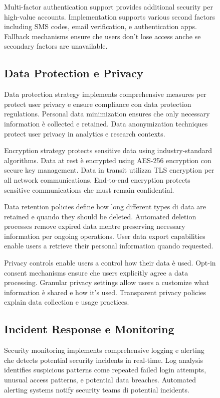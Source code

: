 \documentclass[12pt,a4paper]{article}
\begin{document}
\begin{figure}[H]
Multi-factor authentication support provides additional security per high-value accounts. Implementation supports various second factors including SMS codes, email verification, e authentication apps. Fallback mechanisms ensure che users don't lose access anche se secondary factors are unavailable.

\subsection{Data Protection e Privacy}

Data protection strategy implements comprehensive measures per protect user privacy e ensure compliance con data protection regulations. Personal data minimization ensures che only necessary information è collected e retained. Data anonymization techniques protect user privacy in analytics e research contexts.

Encryption strategy protects sensitive data using industry-standard algorithms. Data at rest è encrypted using AES-256 encryption con secure key management. Data in transit utilizza TLS encryption per all network communications. End-to-end encryption protects sensitive communications che must remain confidential.

Data retention policies define how long different types di data are retained e quando they should be deleted. Automated deletion processes remove expired data mentre preserving necessary information per ongoing operations. User data export capabilities enable users a retrieve their personal information quando requested.

Privacy controls enable users a control how their data è used. Opt-in consent mechanisms ensure che users explicitly agree a data processing. Granular privacy settings allow users a customize what information è shared e how it's used. Transparent privacy policies explain data collection e usage practices.

\subsection{Incident Response e Monitoring}

Security monitoring implements comprehensive logging e alerting che detects potential security incidents in real-time. Log analysis identifies suspicious patterns come repeated failed login attempts, unusual access patterns, e potential data breaches. Automated alerting systems notify security teams di potential incidents.


\end{figure}
\end{document}
